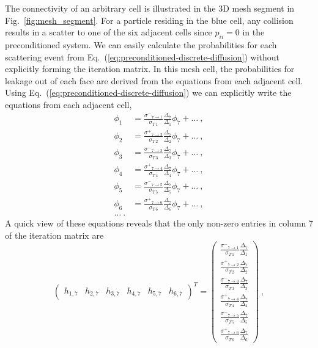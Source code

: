 \documentclass[preprint,12pt]{elsarticle}
\newcommand{\sigm}{\ensuremath{\sigma^{-}}}
\newcommand{\sigp}{\ensuremath{\sigma^{+}}}
\begin{document}
The connectivity of an arbitrary cell is illustrated in the 3D mesh
segment in Fig.~\ref{fig:mesh_segment}.  For a particle residing in
the blue cell, any collision results in a scatter to one of the six
adjacent cells since $p_{ii}=0$ in the preconditioned system.  We can
easily calculate the probabilities for each scattering event from
Eq.~(\ref{eq:preconditioned-discrete-diffusion}) without explicitly
forming the iteration matrix.  In this mesh cell, the probabilities
for leakage out of each face are derived from the equations from each
adjacent cell.  Using Eq.~(\ref{eq:preconditioned-discrete-diffusion})
we can explicitly write the equations from each adjacent cell,
\begin{align*}
  \phi_1 &= \frac{\sigm_{7\rightarrow
      1}}{\sigma_{T\,1}}\frac{\Delta_7}{\Delta_1}\phi_7 + \ldots\:,\\
  \phi_2 &= \frac{\sigp_{7\rightarrow
      2}}{\sigma_{T\,2}}\frac{\Delta_7}{\Delta_2}\phi_7 + \ldots\:,\\
  \phi_3 &= \frac{\sigm_{7\rightarrow
      3}}{\sigma_{T\,3}}\frac{\Delta_7}{\Delta_3}\phi_7 + \ldots\:,\\
  \phi_4 &= \frac{\sigp_{7\rightarrow
      4}}{\sigma_{T\,4}}\frac{\Delta_7}{\Delta_4}\phi_7 + \ldots\:,\\
  \phi_5 &= \frac{\sigm_{7\rightarrow
      5}}{\sigma_{T\,5}}\frac{\Delta_7}{\Delta_5}\phi_7 + \ldots\:,\\
  \phi_6 &= \frac{\sigp_{7\rightarrow
      6}}{\sigma_{T\,6}}\frac{\Delta_7}{\Delta_6}\phi_7 + \ldots\:,\\
  \ldots\:.
\end{align*} 
A quick view of these equations reveals that the only non-zero entries
in column 7 of the iteration matrix are
\begin{equation*}
  \begin{pmatrix}
    h_{1,7} &
    h_{2,7} &
    h_{3,7} &
    h_{4,7} &
    h_{5,7} &
    h_{6,7} 
  \end{pmatrix}^{T}
  = 
  \begin{pmatrix}
    \frac{\sigm_{7\rightarrow 1}}{\sigma_{T\,1}}\frac{\Delta_7}{\Delta_1} \\
    \frac{\sigp_{7\rightarrow 2}}{\sigma_{T\,2}}\frac{\Delta_7}{\Delta_2} \\
    \frac{\sigm_{7\rightarrow 3}}{\sigma_{T\,3}}\frac{\Delta_7}{\Delta_3} \\
    \frac{\sigp_{7\rightarrow 4}}{\sigma_{T\,4}}\frac{\Delta_7}{\Delta_4} \\
    \frac{\sigm_{7\rightarrow 5}}{\sigma_{T\,5}}\frac{\Delta_7}{\Delta_5} \\
    \frac{\sigp_{7\rightarrow 6}}{\sigma_{T\,6}}\frac{\Delta_7}{\Delta_6}
  \end{pmatrix}\:,
\end{equation*}
\end{document}
